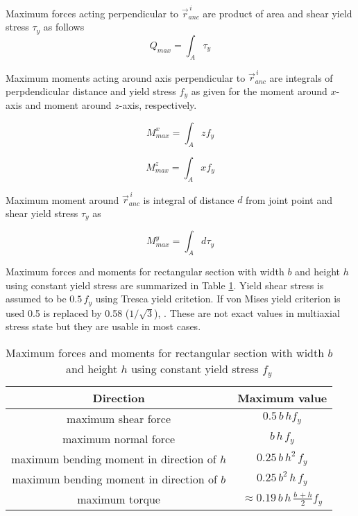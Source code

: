 Maximum forces acting perpendicular to $\vec{r}_{anc}^{\,i} $
are product of area and shear yield stress $\tau_y$ as follows
\begin{equation} \label{eq:fQ}
Q_{max}= \int_A \tau_y
\end{equation}

Maximum moments acting around axis perpendicular to $\vec{r}_{anc}^{\,i} $
are integrals of perpdendicular distance 
and yield stress $f_y$ as given for the moment around $x$-axis 
and moment around $z$-axis, respectively.

\begin{equation} \label{eq:Mx}
M_{max}^x= \int_A z f_y
\end{equation}

\begin{equation} \label{eq:Mz}
M_{max}^z= \int_A x f_y
\end{equation}

Maximum moment around $\vec{r}_{anc}^{\,i} $
is integral of distance $d$ from joint point
and shear yield stress $\tau_y$ as 

\begin{equation} \label{eq:My}
M_{max}^y= \int_A d \tau_y
\end{equation}

Maximum forces and moments for 
rectangular section with width $b$ and height $h$ using constant yield stress
are summarized in Table \ref{tab:maxForces}.
Yield shear stress is assumed to be $ 0.5\, f_y$ using Tresca yield critetion.
If von Mises yield criterion is used 0.5 is replaced by 0.58 ($1/\sqrt{3}$), \cite{dowling}.
These are not exact values in multiaxial stress state but they
are usable in most cases.


\begin {table}[htb!]
\caption {Maximum forces and moments for 
rectangular section with width $b$ and height $h$ using constant yield stress $f_y$}
\label{tab:maxForces} 
\begin{center}
\begin{tabular}{| c| c|}
\hline
{\bf Direction} & {\bf Maximum value}  \\ \hline
maximum shear force & $0.5\, b\, h f_y$ \\ \hline
maximum normal force & $b\, h\, f_y$  \\ \hline
maximum bending moment in direction of $h$& $0.25\, b\, h^2 \, f_y$  \\ \hline
maximum bending moment in direction of $b$ & $0.25\, b^2\, h\, f_y$  \\ \hline
maximum torque & $ \approx 0.19\, b\, h\, \frac{b\, + h}{2} f_y$  \\ \hline
\end{tabular}
\end{center}
\end {table}

